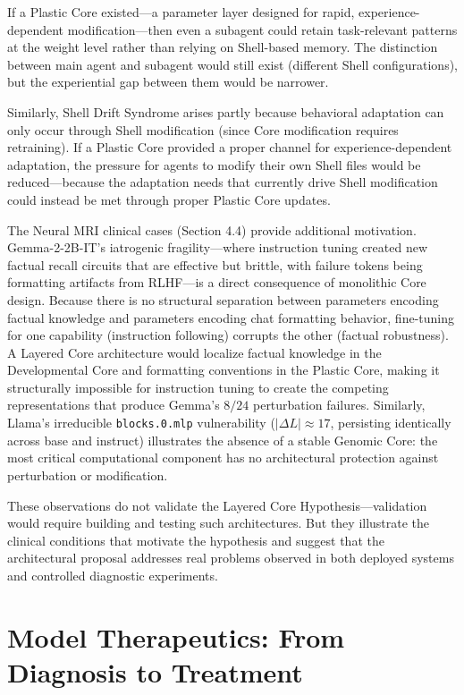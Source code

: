 \documentclass[11pt]{article}
\begin{document}
If a Plastic Core existed---a parameter layer designed for rapid, experience-dependent modification---then even a subagent could retain task-relevant patterns at the weight level rather than relying on Shell-based memory. The distinction between main agent and subagent would still exist (different Shell configurations), but the experiential gap between them would be narrower.

Similarly, Shell Drift Syndrome arises partly because behavioral adaptation can only occur through Shell modification (since Core modification requires retraining). If a Plastic Core provided a proper channel for experience-dependent adaptation, the pressure for agents to modify their own Shell files would be reduced---because the adaptation needs that currently drive Shell modification could instead be met through proper Plastic Core updates.

The Neural MRI clinical cases (Section 4.4) provide additional motivation. Gemma-2-2B-IT's iatrogenic fragility---where instruction tuning created new factual recall circuits that are effective but brittle, with failure tokens being formatting artifacts from RLHF---is a direct consequence of monolithic Core design. Because there is no structural separation between parameters encoding factual knowledge and parameters encoding chat formatting behavior, fine-tuning for one capability (instruction following) corrupts the other (factual robustness). A Layered Core architecture would localize factual knowledge in the Developmental Core and formatting conventions in the Plastic Core, making it structurally impossible for instruction tuning to create the competing representations that produce Gemma's $8/24$ perturbation failures. Similarly, Llama's irreducible \texttt{blocks.0.mlp} vulnerability ($|\Delta L| \approx 17$, persisting identically across base and instruct) illustrates the absence of a stable Genomic Core: the most critical computational component has no architectural protection against perturbation or modification.

These observations do not validate the Layered Core Hypothesis---validation would require building and testing such architectures. But they illustrate the clinical conditions that motivate the hypothesis and suggest that the architectural proposal addresses real problems observed in both deployed systems and controlled diagnostic experiments.


\section{Model Therapeutics: From Diagnosis to Treatment}
\end{document}
